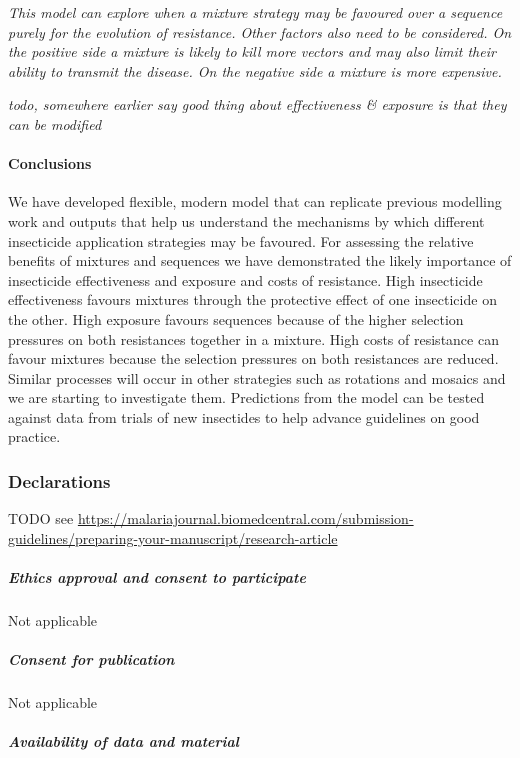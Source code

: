 \documentclass[11pt,]{article}
\let\oldparagraph\paragraph
\renewcommand{\paragraph}[1]{\oldparagraph{#1}\mbox{}}
\let\oldsubparagraph\subparagraph
\renewcommand{\subparagraph}[1]{\oldsubparagraph{#1}\mbox{}}
\begin{document}
\emph{This model can explore when a mixture strategy may be favoured
over a sequence purely for the evolution of resistance. Other factors
also need to be considered. On the positive side a mixture is likely to
kill more vectors and may also limit their ability to transmit the
disease. On the negative side a mixture is more expensive.}

\emph{todo, somewhere earlier say good thing about effectiveness \&
exposure is that they can be modified}

\paragraph{Conclusions}\label{conclusions-1}

We have developed flexible, modern model that can replicate previous
modelling work and outputs that help us understand the mechanisms by
which different insecticide application strategies may be favoured. For
assessing the relative benefits of mixtures and sequences we have
demonstrated the likely importance of insecticide effectiveness and
exposure and costs of resistance. High insecticide effectiveness favours
mixtures through the protective effect of one insecticide on the other.
High exposure favours sequences because of the higher selection
pressures on both resistances together in a mixture. High costs of
resistance can favour mixtures because the selection pressures on both
resistances are reduced. Similar processes will occur in other
strategies such as rotations and mosaics and we are starting to
investigate them. Predictions from the model can be tested against data
from trials of new insectides to help advance guidelines on good
practice.

\subsubsection{Declarations}\label{declarations}

TODO see
\url{https://malariajournal.biomedcentral.com/submission-guidelines/preparing-your-manuscript/research-article}

\subparagraph{Ethics approval and consent to
participate}\label{ethics-approval-and-consent-to-participate}

Not applicable

\subparagraph{Consent for publication}\label{consent-for-publication}

Not applicable

\subparagraph{Availability of data and
material}\label{availability-of-data-and-material}
\end{document}
